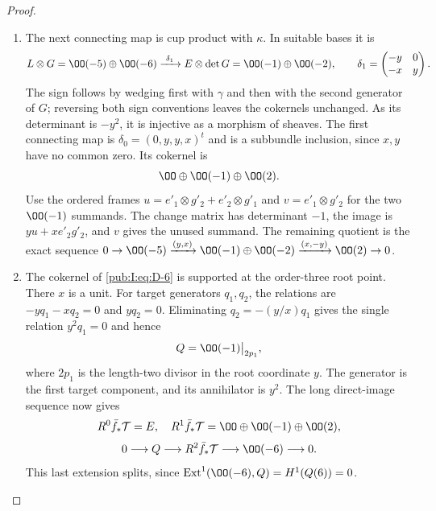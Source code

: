 \begin{proof}
\begin{enumerate}[label=\arabic*.,leftmargin=*]
\begin{enumerate}[label=(\alph*),leftmargin=*]
\item The next connecting map is cup product with $\kappa$. In suitable
bases it is
\begin{equation}
 L\otimes G=\OO(-5)\oplus\OO(-6)
 \xrightarrow{\ \delta_1\ }
 E\otimes\det G=\OO(-1)\oplus\OO(-2),\qquad
 \delta_1=\begin{pmatrix}-y&0\\-x&y\end{pmatrix}.
\label{pub:I:eq:D-6}
\end{equation}
The sign follows by wedging first with $\gamma$ and then with the
second generator of $G$; reversing both sign conventions leaves the
cokernels unchanged. As its determinant is $-y^2$, it is injective as
a morphism of sheaves. The first connecting map is
$\delta_0=(0,y,y,x)^t$ and is a subbundle inclusion, since $x,y$ have
no common zero. Its cokernel is
\begin{equation}
 \OO\oplus\OO(-1)\oplus\OO(2).
\label{pub:I:eq:D-7}
\end{equation}
Use the ordered frames
$u=e'_1\otimes g'_2+e'_2\otimes g'_1$ and
$v=e'_1\otimes g'_2$ for the two $\OO(-1)$ summands.
The change matrix has determinant $-1$, the image is $yu+xe'_2g'_2$,
and $v$ gives the unused summand. The remaining quotient is the exact sequence
$0\to\OO(-5)\xrightarrow{(y,x)}\OO(-1)\oplus\OO(-2)
\xrightarrow{(x,-y)}\OO(2)\to0$.

\item The cokernel of \eqref{pub:I:eq:D-6} is supported at the order-three root point. There $x$ is a unit. For target generators $q_1,q_2$, the
relations are $-yq_1-xq_2=0$ and $yq_2=0$. Eliminating
$q_2=-(y/x)q_1$ gives the single relation $y^2q_1=0$ and hence
\begin{equation}
 Q=\OO(-1)\big|_{2p_1},
\label{pub:I:eq:D-8}
\end{equation}
where $2p_1$ is the length-two divisor in the root coordinate $y$. The generator is the first target component,
and its annihilator is $y^2$. The long direct-image sequence now gives
\[
 R^0\bar f_*\mathcal T=E,\quad
 R^1\bar f_*\mathcal T=\OO\oplus\OO(-1)\oplus\OO(2),
\]
\begin{equation}
 0\longrightarrow Q\longrightarrow R^2\bar f_*\mathcal T
 \longrightarrow\OO(-6)\longrightarrow0.
\label{pub:I:eq:D-9}
\end{equation}
This last extension splits, since $\operatorname{Ext}^1(\OO(-6),Q)
=H^1(Q(6))=0$.


\end{enumerate}
\end{enumerate}
\end{proof}
